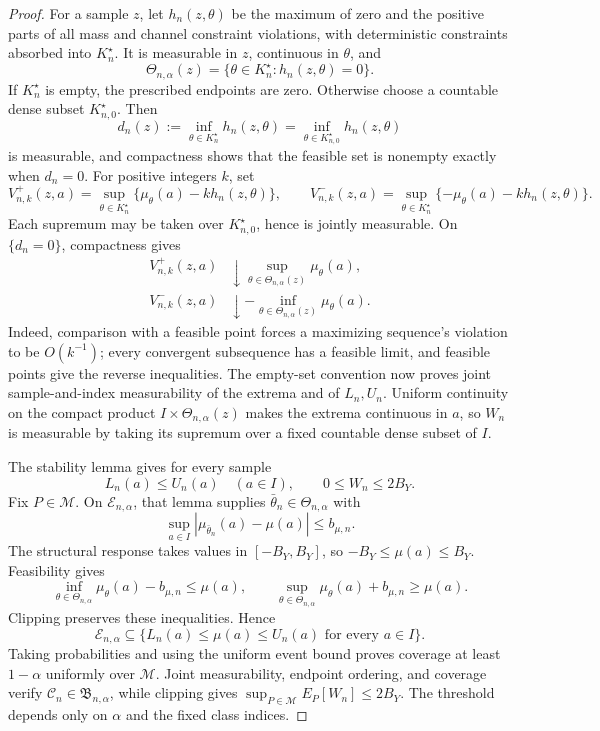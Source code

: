 \documentclass{article}
\begin{document}
\begin{proof}
For a sample \(z\), let \(h_n(z,\theta)\) be the maximum of zero and the positive parts of all mass and channel constraint violations, with deterministic constraints absorbed into \(K_n^\star\). It is measurable in \(z\), continuous in \(\theta\), and
\[
 \Theta_{n,\alpha}(z)=\{\theta\in K_n^\star:h_n(z,\theta)=0\}.
\]
If \(K_n^\star\) is empty, the prescribed endpoints are zero. Otherwise choose a countable dense subset \(K_{n,0}^\star\). Then
\[
 d_n(z):=\inf_{\theta\in K_n^\star}h_n(z,\theta)
 =\inf_{\theta\in K_{n,0}^\star}h_n(z,\theta)
\]
is measurable, and compactness shows that the feasible set is nonempty exactly when \(d_n=0\). For positive integers \(k\), set
\[
 V_{n,k}^+(z,a)=\sup_{\theta\in K_n^\star}
 \{\mu_\theta(a)-kh_n(z,\theta)\},
 \qquad
 V_{n,k}^-(z,a)=\sup_{\theta\in K_n^\star}
 \{-\mu_\theta(a)-kh_n(z,\theta)\}.
\]
Each supremum may be taken over \(K_{n,0}^\star\), hence is jointly measurable. On \(\{d_n=0\}\), compactness gives
\[
 \begin{aligned}
 V_{n,k}^+(z,a)&\downarrow
 \sup_{\theta\in\Theta_{n,\alpha}(z)}\mu_\theta(a),\\
 V_{n,k}^-(z,a)&\downarrow
 -\inf_{\theta\in\Theta_{n,\alpha}(z)}\mu_\theta(a).
 \end{aligned}
\]
Indeed, comparison with a feasible point forces a maximizing sequence's violation to be \(O(k^{-1})\); every convergent subsequence has a feasible limit, and feasible points give the reverse inequalities. The empty-set convention now proves joint sample-and-index measurability of the extrema and of \(L_n,U_n\). Uniform continuity on the compact product \(I\times\Theta_{n,\alpha}(z)\) makes the extrema continuous in \(a\), so \(W_n\) is measurable by taking its supremum over a fixed countable dense subset of \(I\).

The stability lemma gives for every sample
\[
 L_n(a)\le U_n(a)\quad(a\in I),
 \qquad0\le W_n\le2B_Y.
\]
Fix \(P\in\mathcal M\). On \(\mathcal E_{n,\alpha}\), that lemma supplies \(\bar\theta_n\in\Theta_{n,\alpha}\) with
\[
 \sup_{a\in I}|\mu_{\bar\theta_n}(a)-\mu(a)|\le b_{\mu,n}.
\]
The structural response takes values in \([-B_Y,B_Y]\), so \(-B_Y\le\mu(a)\le B_Y\). Feasibility gives
\[
 \inf_{\theta\in\Theta_{n,\alpha}}\mu_\theta(a)-b_{\mu,n}\le\mu(a),
 \qquad
 \sup_{\theta\in\Theta_{n,\alpha}}\mu_\theta(a)+b_{\mu,n}\ge\mu(a).
\]
Clipping preserves these inequalities. Hence
\[
 \mathcal E_{n,\alpha}\subseteq
 \{L_n(a)\le\mu(a)\le U_n(a)\text{ for every }a\in I\}.
\]
Taking probabilities and using the uniform event bound proves coverage at least \(1-\alpha\) uniformly over \(\mathcal M\). Joint measurability, endpoint ordering, and coverage verify \(\mathcal C_n\in\mathfrak B_{n,\alpha}\), while clipping gives \(\sup_{P\in\mathcal M}E_P[W_n]\le2B_Y\). The threshold depends only on \(\alpha\) and the fixed class indices.
\end{proof}
\end{document}
